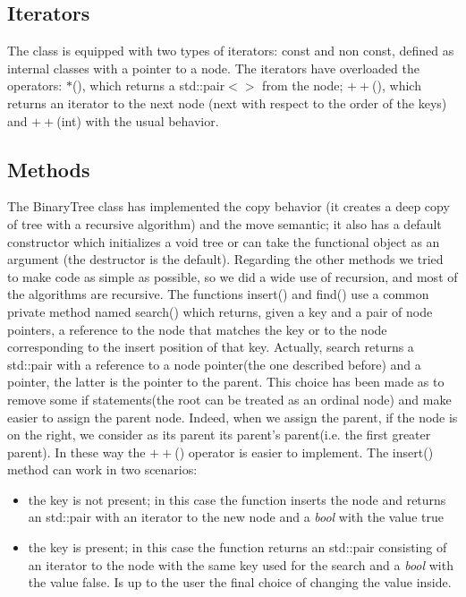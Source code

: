 \documentclass[a4paper,11pt]{article}
\begin{document}
\subsection*{Iterators}

The class is equipped with two types of iterators: const and non const, defined as internal classes with a pointer to a node. The iterators have overloaded the operators: $*$(), which returns a std::pair$<>$ from the node; $++$(), which returns an iterator to the next node (next with respect to the order of the keys) and $++$(int) with the usual behavior. 

\subsection*{Methods}

The BinaryTree class has implemented the copy behavior (it creates a deep copy of tree with a recursive algorithm) and the move semantic; it also has a default constructor which initializes a void tree or can take the functional object as an argument (the destructor is the default). Regarding the other methods we tried to make code as simple as possible, so we did a wide use of recursion, and most of the algorithms are recursive. The functions insert() and find() use a common private method named search() which returns, given a key and a pair of node pointers, a reference to the node that matches the key or to the node corresponding to the insert position of that key. Actually, search returns a std::pair with a reference to a node pointer(the one described before) and a pointer, the latter is the pointer to the parent. This choice has been made as to remove some if statements(the root can be treated as an ordinal node) and make easier to assign the parent node. Indeed, when we assign the parent, if the node is on the right, we consider as its parent its parent's parent(i.e. the first greater parent). In these way the $++$() operator is easier to implement. The insert() method can work in two scenarios: 
\begin{itemize}
	\item the key is not present; in this case the function inserts the node and returns an std::pair with an iterator to the new node and a \emph{bool} with the value true
	\item the key is present; in this case the function returns an std::pair consisting of an iterator to the node with the same key used for the search and a \emph{bool} with the value false. Is up to the user the final choice of changing the value inside.
\end{itemize}
\end{document}

